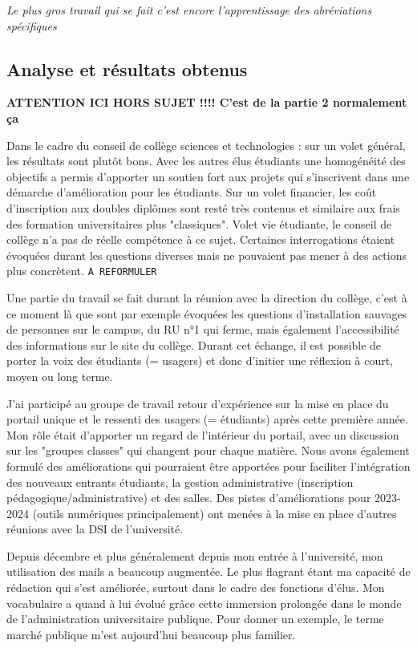\documentclass{article}
\begin{document}
\textit{Le plus gros travail qui se fait c'est encore l'apprentissage des abréviations spécifiques}

\subsection{Analyse et résultats obtenus} \textbf{ATTENTION ICI HORS SUJET !!!! C'est de la partie 2 normalement ça} \\ $ $

Dans le cadre du conseil de collège sciences et technologies : sur un volet général, les résultats sont plutôt bons. Avec les autres élus étudiants une homogénéité des objectifs a permis d'apporter un soutien fort aux projets qui s'inscrivent dans une démarche d'amélioration pour les étudiants. Sur un volet financier, les coût d'inscription aux doubles diplômes sont resté très contenus et similaire aux frais des formation universitaires plus "classiques". Volet vie étudiante, le conseil de collège n'a pas de réelle compétence à ce sujet. Certaines interrogations étaient évoquées durant les questions diverses mais ne pouvaient pas mener à des actions plus concrètent. \texttt{A REFORMULER}

Une partie du travail se fait durant la réunion avec la direction du collège, c'est à ce moment là que sont par exemple évoquées les questions d'installation sauvages de personnes sur le campus, du RU n°1 qui ferme, mais également l'accessibilité des informations sur le site du collège. Durant cet échange, il est possible de porter la voix des étudiants (= usagers) et donc d'initier une réflexion à court, moyen ou long terme.

J'ai participé au groupe de travail retour d'expérience sur la mise en place du portail unique et le ressenti des usagers (= étudiants) après cette première année. Mon rôle était d'apporter un regard de l'intérieur du portail, avec un discussion sur les "groupes classes" qui changent pour chaque matière. Nous avons également formulé des améliorations qui pourraient être apportées pour faciliter l'intégration des nouveaux entrants étudiants, la gestion administrative (inscription pédagogique/administrative) et des salles. Des pistes d'améliorations pour 2023-2024 (outils numériques principalement) ont menées à la mise en place d'autres réunions avec la DSI de l'université.

Depuis décembre et plus généralement depuis mon entrée à l'université, mon utilisation des mails a beaucoup augmentée. Le plus flagrant étant ma capacité de rédaction qui s'est améliorée, surtout dans le cadre des fonctions d'élus. Mon vocabulaire a quand à lui évolué grâce cette immersion prolongée dans le monde de l'administration universitaire publique. Pour donner un exemple, le terme marché publique m'est aujourd'hui beaucoup plus familier. 
\end{document}
